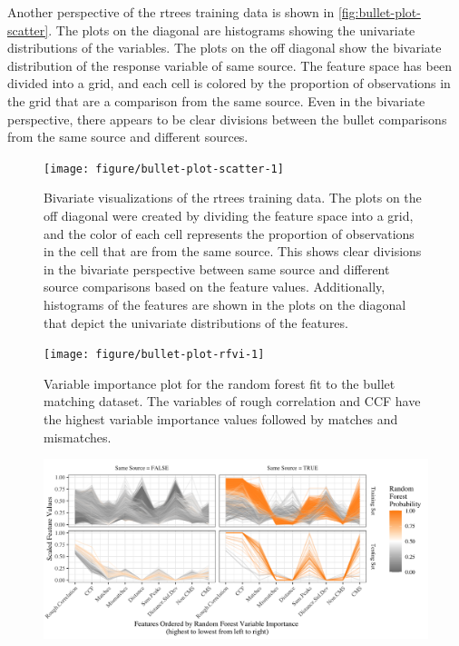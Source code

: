 \documentclass[AMS,STIX2COL]{WileyNJD-v2}\usepackage[]{graphicx}\usepackage[]{color}
\newenvironment{knitrout}{}{} %
\begin{document}
{Another perspective of the rtrees training data is shown in \autoref{fig:bullet-plot-scatter}. The plots on the diagonal are histograms showing the univariate distributions of the variables. The plots on the off diagonal show the bivariate distribution of the response variable of same source. The feature space has been divided into a grid, and each cell is colored by the proportion of observations in the grid that are a comparison from the same source. Even in the bivariate perspective, there appears to be clear divisions between the bullet comparisons from the same source and different sources.

\begin{figure}[!t]
\begin{knitrout}
\color{fgcolor}
\texttt{[image: figure/bullet-plot-scatter-1]} 

\end{knitrout}
\caption{Bivariate visualizations of the rtrees training data. The plots on the off diagonal were created by dividing the feature space into a grid, and the color of each cell represents the proportion of observations in the cell that are from the same source. This shows clear divisions in the bivariate perspective between same source and different source comparisons based on the feature values. Additionally, histograms of the features are shown in the plots on the diagonal that depict the univariate distributions of the features.}
\label{fig:bullet-plot-scatter}
\end{figure}

\begin{figure}[!b]
\begin{knitrout}
\color{fgcolor}
\texttt{[image: figure/bullet-plot-rfvi-1]} 

\end{knitrout}
\caption{Variable importance plot for the random forest fit to the bullet matching dataset. The variables of rough correlation and CCF have the highest variable importance values followed by matches and mismatches.}
\label{fig:bullet-plot-rfvi}
\end{figure}

\begin{figure}[!b]
\begin{knitrout}
\color{fgcolor}
\includegraphics[width=\textwidth]{./figure-static/bullet_pcp} 


\end{knitrout}
\end{figure}}
\end{document}

